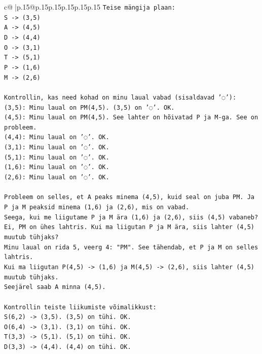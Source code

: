 \documentclass{article}
\begin{document}
{\begin{supertabular}{c@{$\;$}|p{.15\linewidth}@{}p{.15\linewidth}p{.15\linewidth}p{.15\linewidth}p{.15\linewidth}p{.15\linewidth}}
{{{\texttt{Teise mängija plaan:} \\
\texttt{S {-}> (3,5)} \\
\texttt{A {-}> (4,5)} \\
\texttt{D {-}> (4,4)} \\
\texttt{O {-}> (3,1)} \\
\texttt{T {-}> (5,1)} \\
\texttt{P {-}> (1,6)} \\
\texttt{M {-}> (2,6)} \\
\\ 
\texttt{Kontrollin, kas need kohad on minu laual vabad (sisaldavad '◌'):} \\
\texttt{(3,5): Minu laual on PM(4,5). (3,5) on '◌'. OK.} \\
\texttt{(4,5): Minu laual on PM(4,5). See lahter on hõivatad P ja M{-}ga. See on probleem.} \\
\texttt{(4,4): Minu laual on '◌'. OK.} \\
\texttt{(3,1): Minu laual on '◌'. OK.} \\
\texttt{(5,1): Minu laual on '◌'. OK.} \\
\texttt{(1,6): Minu laual on '◌'. OK.} \\
\texttt{(2,6): Minu laual on '◌'. OK.} \\
\\ 
\texttt{Probleem on selles, et A peaks minema (4,5), kuid seal on juba PM. Ja P ja M peaksid minema (1,6) ja (2,6), mis on vabad.} \\
\texttt{Seega, kui me liigutame P ja M ära (1,6) ja (2,6), siis (4,5) vabaneb? Ei, PM on ühes lahtris. Kui ma liigutan P ja M ära, siis lahter (4,5) muutub tühjaks?} \\
\texttt{Minu laual on rida 5, veerg 4: "PM". See tähendab, et P ja M on selles lahtris.} \\
\texttt{Kui ma liigutan P(4,5) {-}> (1,6) ja M(4,5) {-}> (2,6), siis lahter (4,5) muutub tühjaks.} \\
\texttt{Seejärel saab A minna (4,5).} \\
\\ 
\texttt{Kontrollin teiste liikumiste võimalikkust:} \\
\texttt{S(6,2) {-}> (3,5). (3,5) on tühi. OK.} \\
\texttt{O(6,4) {-}> (3,1). (3,1) on tühi. OK.} \\
\texttt{T(3,3) {-}> (5,1). (5,1) on tühi. OK.} \\
\texttt{D(3,3) {-}> (4,4). (4,4) on tühi. OK.} \\
}}}
\end{supertabular}}
\end{document}
